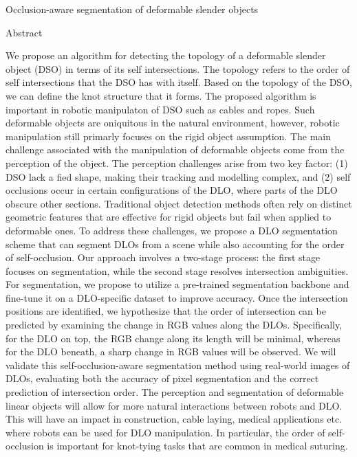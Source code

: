 Occlusion-aware segmentation of deformable slender objects

Abstract

We propose an algorithm for detecting the topology of a deformable
slender object (DSO) in terms of its self intersections. The topology
refers to the order of self intersections that the DSO has with itself.
Based on the topology of the DSO, we can define the knot structure that
it forms. The proposed algorithm is important in robotic manipulaton of
DSO such as cables and ropes. Such deformable objects are oniquitous in
the natural environment, however, robotic manipulation still primarly
focuses on the rigid object assumption. The main challenge associated
with the manipulation of deformable objects come from the perception of
the object. The perception challenges arise from two key factor: (1) DSO
lack a fied shape, making their tracking and modelling complex, and (2)
self occlusions occur in certain configurations of the DLO, where parts
of the DLO obscure other sections. Traditional object detection methods
often rely on distinct geometric features that are effective for rigid
objects but fail when applied to deformable ones. To address these
challenges, we propose a DLO segmentation scheme that can segment DLOs
from a scene while also accounting for the order of self-occlusion. Our
approach involves a two-stage process: the first stage focuses on
segmentation, while the second stage resolves intersection ambiguities.
For segmentation, we propose to utilize a pre-trained segmentation
backbone and fine-tune it on a DLO-specific dataset to improve accuracy.
Once the intersection positions are identified, we hypothesize that the
order of intersection can be predicted by examining the change in RGB
values along the DLOs. Specifically, for the DLO on top, the RGB change
along its length will be minimal, whereas for the DLO beneath, a sharp
change in RGB values will be observed. We will validate this
self-occlusion-aware segmentation method using real-world images of
DLOs, evaluating both the accuracy of pixel segmentation and the correct
prediction of intersection order. The perception and segmentation of
deformable linear objects will allow for more natural interactions
between robots and DLO. This will have an impact in construction, cable
laying, medical applications etc. where robots can be used for DLO
manipulation. In particular, the order of self-occlusion is important
for knot-tying tasks that are common in medical suturing.

